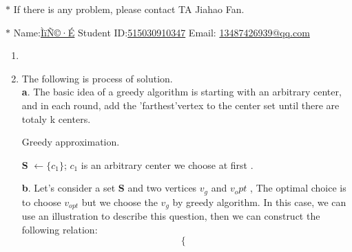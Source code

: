 \documentclass[12pt,a4paper]{article}
\makeatletter
\newtheorem*{solution}{Solution}
\theoremstyle{definition}
\renewenvironment{solution}[1][Solution] {\par\pushQED{\qed}\normalfont\topsep6\p@\@plus6\p@\relax\trivlist\item[\hskip\labelsep\bfseries#1\@addpunct{.}]\ignorespaces}{\popQED\endtrivlist\@endpefalse} \makeatother
\makeatother
\begin{document}
\noindent

\noindent{}
\begin{center}
\footnotesize{\color{red}$*$ If there is any problem, please contact TA Jiahao Fan.}

\footnotesize{\color{blue}$*$ Name:\underline{ÌïÑ©·É} \quad Student ID:\underline{515030910347} \quad Email: \underline{13487426939@qq.com}}
\end{center}

\begin{enumerate}
    \item
        \begin{solution}
        The following is process of solution.\\
          \textbf{a}. The basic idea of a greedy algorithm is starting with an arbitrary center, and in each round, add the 'farthest'vertex to the center set until there are totaly k centers.\\
          \begin{algorithm}[H]
            \caption{Greedy approximation.}
            $\textbf{S } \leftarrow \{c_{1}\}$;  $c_1$ is an arbitrary center we choose at first .\\
          \end{algorithm}
          \textbf{b}. Let's consider a set  \textbf{S} and  two vertices $v_g$ and $v_opt$ , The optimal choice is to choose $v_{opt}$ but we choose the $v_g$ by greedy algorithm. In this case,  we can use an illustration to describe this question, then we can construct the following relation: \\
          \begin{equation*}
          \begin{cases}

\end{cases}
\end{equation*}
\end{solution}
\end{enumerate}
\end{document}
